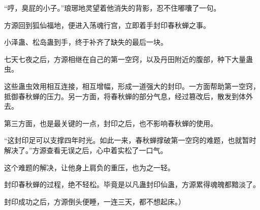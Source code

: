 \begin{this_body}
“哼，臭屁的小子。”琅琊地灵望着他消失的背影，忍不住嘟囔了一句。

方源回到狐仙福地，便进入荡魂行宫，立即着手封印春秋蝉之事。

小泽蛊、松岛蛊到手，终于补齐了缺失的最后一块。

七天七夜之后，方源相继在自己的第一空窍，以及丹田附近的腹部，种下大量蛊虫。

这些蛊虫效用相互连接，相互增幅，形成一道强大的封印。一方面帮助第一空窍，抵御春秋蝉的压力。另一方面，将春秋蝉的部分气息，经过篡改后，散发到体外去。

第三方面，也是最关键的一点，封印之后，也不影响春秋蝉的使用。

“这封印足可以支撑四年时光。如此一来，春秋蝉撑破第一空窍的难题，也就暂时解决了。”方源查看无误之后，心中着实松了一口气。

这个难题的解决，让他身上肩负的重压，也为之一轻。

封印春秋蝉的过程，绝不轻松。毕竟是以凡蛊封印仙蛊，方源累得魂魄都黯淡了。

封印成功之后，方源倒头便睡，一连三天，都不想起床。）

\end{this_body}

